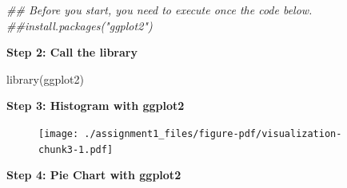 \documentclass[
  letterpaper,
  DIV=11,
  numbers=noendperiod]{scrreprt}
\newenvironment{Shaded}{\begin{snugshade}}{\end{snugshade}}
\newcommand{\AttributeTok}[1]{\textcolor[rgb]{0.40,0.45,0.13}{#1}}
\newcommand{\DocumentationTok}[1]{\textcolor[rgb]{0.37,0.37,0.37}{\textit{#1}}}
\newcommand{\FunctionTok}[1]{\textcolor[rgb]{0.28,0.35,0.67}{#1}}
\newcommand{\NormalTok}[1]{\textcolor[rgb]{0.00,0.23,0.31}{#1}}
\newcommand{\OtherTok}[1]{\textcolor[rgb]{0.00,0.23,0.31}{#1}}
\newcommand{\SpecialCharTok}[1]{\textcolor[rgb]{0.37,0.37,0.37}{#1}}
\newcommand{\StringTok}[1]{\textcolor[rgb]{0.13,0.47,0.30}{#1}}
\begin{document}
\begin{Shaded}
\begin{Highlighting}[]
\DocumentationTok{\#\# Before you start, you need to execute once the code below.}
\DocumentationTok{\#\#install.packages("ggplot2")}
\end{Highlighting}
\end{Shaded}

\textbf{Step 2: Call the library}

\begin{Shaded}
\begin{Highlighting}[]
\FunctionTok{library}\NormalTok{(ggplot2)}
\end{Highlighting}
\end{Shaded}

\textbf{Step 3: Histogram with ggplot2}

\begin{Shaded}
\end{Shaded}

\begin{figure}[H]

{\centering \texttt{[image: ./assignment1\_files/figure-pdf/visualization-chunk3-1.pdf]}

}

\end{figure}

\textbf{Step 4: Pie Chart with ggplot2}
\end{document}

